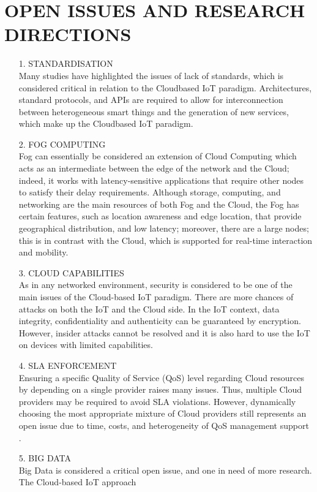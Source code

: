 \documentclass[11pt]{article}
\begin{document}
\section{OPEN ISSUES AND RESEARCH DIRECTIONS}
\begin{itemize}
\item[1.]STANDARDISATION\\
Many studies have highlighted the issues of lack of
standards, which is considered critical in relation to the Cloudbased IoT paradigm. Architectures, standard protocols, and APIs are required to allow for interconnection between heterogeneous smart things and the generation of new services, which make up the Cloudbased IoT paradigm.
\item[2.]FOG COMPUTING\\
Fog can essentially be considered an extension of Cloud Computing which acts as an intermediate between the edge of the network and the Cloud; indeed, it works with latency-sensitive applications that require other nodes to satisfy their delay requirements. Although storage, computing, and
networking are the main resources of both Fog and the Cloud,
the Fog has certain features, such as location awareness and
edge location, that provide geographical distribution, and low
latency; moreover, there are a large nodes; this is in contrast
with the Cloud, which is supported for real-time interaction
and mobility. 
\item[3.]CLOUD CAPABILITIES\\
As in any networked environment, security is considered to
be one of the main issues of the Cloud-based IoT paradigm.
There are more chances of attacks on both the IoT and the
Cloud side. In the IoT context, data integrity, confidentiality
and authenticity can be guaranteed by encryption. However,
insider attacks cannot be resolved and it is also hard to use the IoT on devices with limited capabilities.
\item[4.]SLA ENFORCEMENT\\
Ensuring a specific Quality of Service (QoS) level regarding Cloud resources by depending on a single provider raises many issues. Thus, multiple Cloud providers may be required to avoid SLA violations. However, dynamically choosing the most appropriate mixture of Cloud providers still represents an open issue due to time, costs, and heterogeneity of QoS management support .
\item[5.]BIG DATA\\
Big Data is considered a critical open issue, and
one in need of more research. The Cloud-based IoT approach

\end{itemize}
\end{document}
